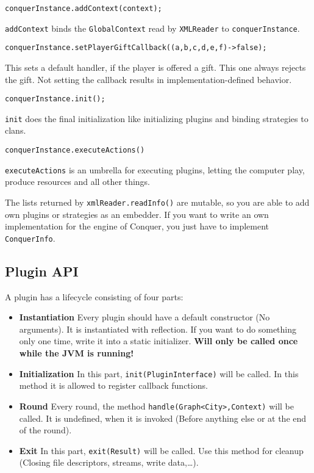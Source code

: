 \documentclass{article}
\begin{document}
    \begin{verbatim}
conquerInstance.addContext(context);
    \end{verbatim}
    \texttt{addContext} binds the \texttt{GlobalContext} read by \texttt{XMLReader} to \texttt{conquerInstance}.
    \begin{verbatim}
conquerInstance.setPlayerGiftCallback((a,b,c,d,e,f)->false);
    \end{verbatim}
    This sets a default handler, if the player is offered a gift. This one always rejects the gift. Not setting the callback results in implementation-defined behavior.
    \begin{verbatim}
conquerInstance.init();
    \end{verbatim}
    \texttt{init} does the final initialization like initializing plugins and binding strategies to clans.
    \begin{verbatim}
conquerInstance.executeActions()
    \end{verbatim}
    \texttt{executeActions} is an umbrella for executing plugins, letting the computer play, produce resources and all other things.\newline

    The lists returned by \texttt{xmlReader.readInfo()} are mutable, so you are able to add own plugins or strategies as an embedder.\newline
    If you want to write an own implementation for the engine of Conquer, you just have to implement \texttt{ConquerInfo}.

    \subsection{Plugin API}
    A plugin has a lifecycle consisting of four parts:
    \begin{itemize}
        \item \textbf{Instantiation} Every plugin should have a default constructor (No arguments). It is instantiated with reflection. If you want to do something only one time, write it into a static initializer. \textbf{Will only be called once while the JVM is running!}
        \item \textbf{Initialization} In this part, \texttt{init(PluginInterface)} will be called. In this method it is allowed to register callback functions.
        \item \textbf{Round} Every round, the method \texttt{handle(Graph<City>,Context)} will be called. It is undefined, when it is invoked (Before anything else or at the end of the round).
        \item \textbf{Exit} In this part, \texttt{exit(Result)} will be called. Use this method for cleanup (Closing file descriptors, streams, write data,\ldots).

    \end{itemize}
\end{document}
